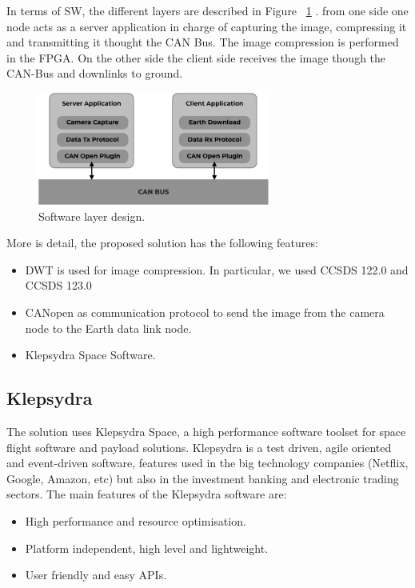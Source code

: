 \documentclass[a4paper,twocolumn]{esapub2005} %
\begin{document}
In terms of SW, the different layers are described in Figure ~\ref{fig:canopen_img_tx_protocol2} . from one side one node acts as a server application in charge of capturing the image, compressing it and transmitting it thought the CAN Bus. The image compression is performed in the FPGA. On the other side the client side receives the image though the CAN-Bus and downlinks to ground.

\begin{figure} [!h]
\centering
\includegraphics[width = 3in]{images/canopen_img_tx_protocol2}
\caption{Software layer design.\label{fig:canopen_img_tx_protocol2}}
\end{figure}

More is detail, the proposed solution has the following features:

\begin{itemize}
\item DWT is used for image compression. In particular, we used CCSDS 122.0 and CCSDS 123.0 
\item CANopen as communication protocol to send the image from the camera node to the Earth data link node.
\item Klepsydra Space Software.
\end{itemize}

\subsection{Klepsydra}
The solution uses Klepsydra Space, a high performance software toolset for space flight software and payload solutions. Klepsydra is a test driven, agile oriented and event-driven software, features used in the big technology companies (Netflix, Google, Amazon, etc) but also in the investment banking and electronic trading sectors. The main features of the Klepsydra software are:

\begin{itemize}
\item High performance and resource optimisation.
\item Platform independent, high level and lightweight.
\item User friendly and easy APIs.
\end{itemize}
\end{document}
